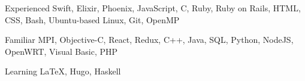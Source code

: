 

\begin{cvskills}

  \cvskill
    {Experienced} %
    {Swift, Elixir, Phoenix, JavaScript, C, Ruby, Ruby on Rails, HTML, CSS, Bash, Ubuntu-based Linux, Git, OpenMP} %

  \cvskill
    {Familiar} %
    {MPI, Objective-C, React, Redux, C++, Java, SQL, Python, NodeJS, OpenWRT, Visual Basic, PHP} %
    
  \cvskill
    {Learning} %
    {\LaTeX, Hugo, Haskell} %
    


\end{cvskills}
